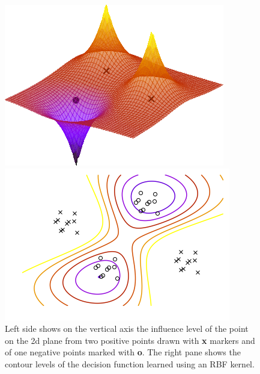 \begin{figure}
  \begin{minipage}{.5\textwidth}
    \centering
    \includegraphics[width=\linewidth]{influence_map.png}
  \end{minipage}%
  \begin{minipage}{.5\textwidth}
    \centering
    \includegraphics[width=\linewidth]{decision_boundary.png}
  \end{minipage}
  \caption{
    Left side shows on the vertical axis the influence level of the point on the 2d plane from two positive points drawn  with \textbf{x} markers and of one negative points marked with \textbf{o}. The right pane shows the contour levels of the decision function learned using an RBF kernel.
  }
\end{figure}

